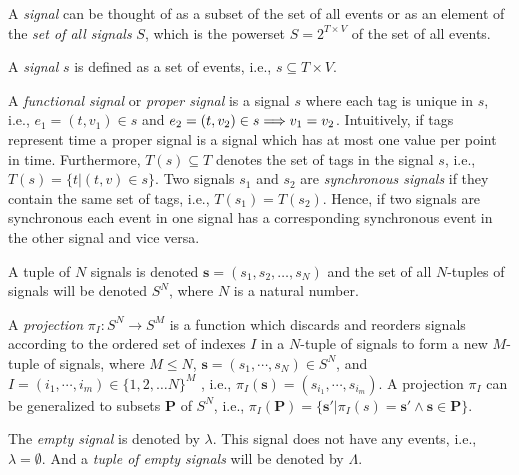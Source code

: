 A \emph{signal} can be thought of as a subset of the set of all events or as
an element of the \emph{set of all signals} $S$, which is the powerset $S = 2^{T \times V}$
of the set of all events.
\begin{sdefinition}
A \emph{signal} $s$ is defined as a set of events, i.e., $s \subseteq T \times V$.
\end{sdefinition}
A \emph{functional signal} or \emph{proper signal} is a signal $s$ where each tag is unique in $s$,
i.e., $e_1 = (t,v_1) \in s$ and $e_2 = (t,v_2) \in s \Longrightarrow v_1 = v_2$.
Intuitively, if tags represent time a proper signal is a signal which has
at most one value per point in time. Furthermore, $T(s) \subseteq T$ denotes
the set of tags in the signal $s$, i.e., $T(s) = \{t|(t,v) \in s\}$.
Two signals $s_1$ and $s_2$ are \emph{synchronous signals} if they contain
the same set of tags, i.e., $T(s_1) = T(s_2)$.
Hence, if two signals are synchronous each event in one
signal has a corresponding synchronous event in the other signal and vice versa.

A tuple of $N$ signals is denoted $\mathbf{s} = (s_1, s_2, \dots, s_N)$ and the
set of all $N$-tuples of signals will be denoted $S^N$, where $N$ is a
natural number.
\begin{sdefinition}
A \emph{projection} $\pi{}_I: S^N \to S^M$ is a function which discards and reorders signals according
to the ordered set of indexes $I$ in a $N$-tuple of signals
to form a new $M$-tuple of signals, where $M \le N$, $\mathbf{s} = (s_1,\cdots,s_N) \in S^N$,
and $I = (i_1,\cdots,i_m) \in \{1,2, \ldots N\}^M$
, i.e., $\pi{}_I(\mathbf{s}) = (s_{i_1}, \cdots, s_{i_m})$.
A projection $\pi{}_I$ can be generalized to subsets $\mathbf{P}$ of $S^N$,
i.e., $\pi{}_I(\mathbf{P}) = \{\mathbf{s'}|\pi{}_I(s) = \mathbf{s'} \wedge \mathbf{s} \in \mathbf{P}\}$.
\end{sdefinition}
The \emph{empty signal} is denoted by $\lambda$. This
signal does not have any events, i.e., $\lambda = \emptyset$. And a \emph{tuple
of empty signals} will be denoted by $\Lambda$.

